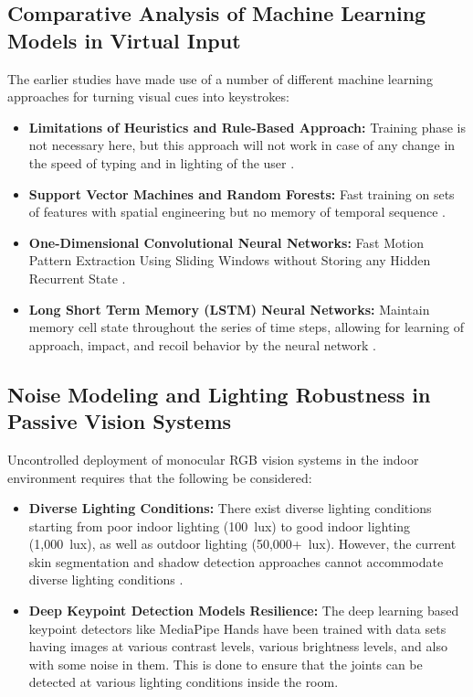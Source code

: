 \subsection{Comparative Analysis of Machine Learning Models in Virtual Input}
\label{subsec:lit_ml_comparative}
The earlier studies have made use of a number of different machine learning approaches for turning visual cues into keystrokes:
\begin{itemize}
    \item \textbf{Limitations of Heuristics and Rule-Based Approach:} Training phase is not necessary here, but this approach will not work in case of any change in the speed of typing and in lighting of the user \cite{Srivastava2012RealTime, Posner2012Single}.
    \item \textbf{Support Vector Machines and Random Forests:} Fast training on sets of features with spatial engineering but no memory of temporal sequence \cite{Webber2021Finger}.
    \item \textbf{One-Dimensional Convolutional Neural Networks:} Fast Motion Pattern Extraction Using Sliding Windows without Storing any Hidden Recurrent State \cite{Lai2018CNN, Ikram2020Skeleton}.
    \item \textbf{Long Short Term Memory (LSTM) Neural Networks:} Maintain memory cell state throughout the series of time steps, allowing for learning of approach, impact, and recoil behavior by the neural network \cite{Hochreiter1997LSTM, Doan2022Efficient, GilMartin2023Hand}.
\end{itemize}

\subsection{Noise Modeling and Lighting Robustness in Passive Vision Systems}
\label{subsec:lit_noise_modeling}
Uncontrolled deployment of monocular RGB vision systems in the indoor environment requires that the following be considered:
\begin{itemize}
    \item \textbf{Diverse Lighting Conditions:} There exist diverse lighting conditions starting from poor indoor lighting (100~lux) to good indoor lighting (1,000~lux), as well as outdoor lighting (50,000+~lux). However, the current skin segmentation and shadow detection approaches cannot accommodate diverse lighting conditions \cite{Yue2014Blind}.
    \item \textbf{Deep Keypoint Detection Models Resilience:} The deep learning based keypoint detectors like MediaPipe Hands \cite{Zhang2020MediaPipe} have been trained with data sets having images at various contrast levels, various brightness levels, and also with some noise in them. This is done to ensure that the joints can be detected at various lighting conditions inside the room.
\end{itemize}

